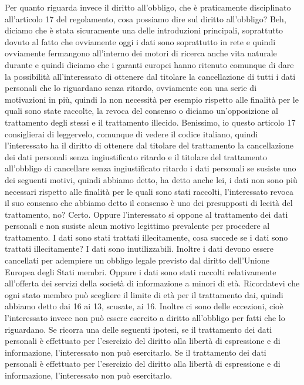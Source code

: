 Per quanto riguarda invece il diritto all'obbligo, che è praticamente disciplinato all'articolo 17 del regolamento, cosa possiamo dire sul diritto all'obbligo?
Beh, diciamo che è stata sicuramente una delle introduzioni principali, soprattutto dovuto al fatto che ovviamente oggi i dati sono soprattutto in rete e quindi ovviamente fermangono all'interno dei motori di ricerca anche vita naturale durante e quindi diciamo che i garanti europei hanno ritenuto comunque di dare la possibilità all'interessato di ottenere dal titolare la cancellazione di tutti i dati personali che lo riguardano senza ritardo, ovviamente con una serie di motivazioni in più, quindi la non necessità per esempio rispetto alle finalità per le quali sono state raccolte, la revoca del consenso o diciamo un'opposizione al trattamento degli stessi e il trattamento illecido.
Benissimo, io questo articolo 17 consiglierai di leggervelo, comunque di vedere il codice italiano, quindi l'interessato ha il diritto di ottenere dal titolare del trattamento la cancellazione dei dati personali senza ingiustificato ritardo e il titolare del trattamento all'obbligo di cancellare senza ingiustificato ritardo i dati personali se susiste uno dei seguenti motivi, quindi abbiamo detto, ha detto anche lei, i dati non sono più necessari rispetto alle finalità per le quali sono stati raccolti, l'interessato revoca il suo consenso che abbiamo detto il consenso è uno dei presupposti di lecità del trattamento, no?
Certo.
Oppure l'interessato si oppone al trattamento dei dati personali e non susiste alcun motivo legittimo prevalente per procedere al trattamento.
I dati sono stati trattati illecitamente, cosa succede se i dati sono trattati illecitamente?
I dati sono inutilizzabili.
Inoltre i dati devono essere cancellati per adempiere un obbligo legale previsto dal diritto dell'Unione Europea degli Stati membri.
Oppure i dati sono stati raccolti relativamente all'offerta dei servizi della società di informazione a minori di età.
Ricordatevi che ogni stato membro può scegliere il limite di età per il trattamento dai, quindi abbiamo detto dai 16 ai 13, scusate, ai 16.
Inoltre ci sono delle eccezioni, cioè l'interessato invece non può essere esercito a diritto all'obbligo per fatti che lo riguardano.
Se ricorra una delle seguenti ipotesi, se il trattamento dei dati personali è effettuato per l'esercizio del diritto alla libertà di espressione e di informazione, l'interessato non può esercitarlo.
Se il trattamento dei dati personali è effettuato per l'esercizio del diritto alla libertà di espressione e di informazione, l'interessato non può esercitarlo.
